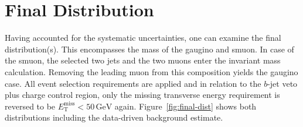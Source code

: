 \section{Final Distribution}
\label{sec:final-dist}

Having accounted for the systematic uncertainties, one can examine the final distribution(s). This encompasses the mass of the gaugino and smuon. In case of the smuon, the selected two jets and the two muons enter the invariant mass calculation. Removing the leading muon from this composition yields the gaugino case. All event selection requirements are applied and in relation to the $b$-jet veto plus charge control region, only the missing transverse energy requirement is reversed to be $E_{\text{T}}^{\text{miss}} < 50\,\text{GeV}$ again. Figure~\ref{fig:final-dist} shows both distributions including the data-driven background estimate.

